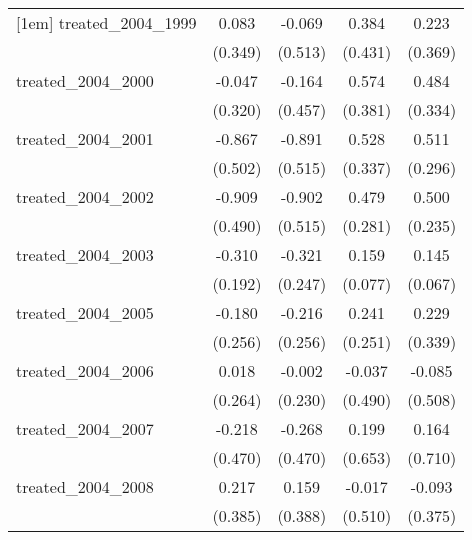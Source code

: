 {\begin{tabular}{l*{4}{c}}
[1em]
treated\_2004\_1999&       0.083         &      -0.069         &       0.384         &       0.223         \\
            &     (0.349)         &     (0.513)         &     (0.431)         &     (0.369)         \\
[1em]
treated\_2004\_2000&      -0.047         &      -0.164         &       0.574         &       0.484         \\
            &     (0.320)         &     (0.457)         &     (0.381)         &     (0.334)         \\
[1em]
treated\_2004\_2001&      -0.867         &      -0.891         &       0.528         &       0.511         \\
            &     (0.502)         &     (0.515)         &     (0.337)         &     (0.296)         \\
[1em]
treated\_2004\_2002&      -0.909         &      -0.902         &       0.479         &       0.500\sym{*}  \\
            &     (0.490)         &     (0.515)         &     (0.281)         &     (0.235)         \\
[1em]
treated\_2004\_2003&      -0.310         &      -0.321         &       0.159\sym{*}  &       0.145\sym{*}  \\
            &     (0.192)         &     (0.247)         &     (0.077)         &     (0.067)         \\
[1em]
treated\_2004\_2005&      -0.180         &      -0.216         &       0.241         &       0.229         \\
            &     (0.256)         &     (0.256)         &     (0.251)         &     (0.339)         \\
[1em]
treated\_2004\_2006&       0.018         &      -0.002         &      -0.037         &      -0.085         \\
            &     (0.264)         &     (0.230)         &     (0.490)         &     (0.508)         \\
[1em]
treated\_2004\_2007&      -0.218         &      -0.268         &       0.199         &       0.164         \\
            &     (0.470)         &     (0.470)         &     (0.653)         &     (0.710)         \\
[1em]
treated\_2004\_2008&       0.217         &       0.159         &      -0.017         &      -0.093         \\
            &     (0.385)         &     (0.388)         &     (0.510)         &     (0.375)         \\

\end{tabular}}
